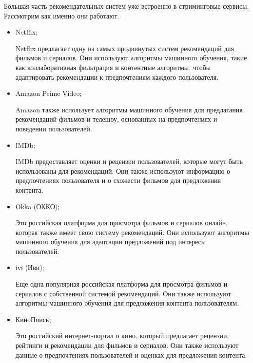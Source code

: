 Большая часть рекомендательных систем уже встроенно в стриминговые сервисы.
Рассмотрим как именно они работают.
\begin{itemize}
	\item Netflix; \par
	Netflix предлагает одну из самых продвинутых систем рекомендаций для фильмов и сериалов.
	Они используют алгоритмы машинного обучения, такие как коллаборативная фильтрация и контентные алгоритмы, чтобы
	адаптировать рекомендации к предпочтениям каждого пользователя.

	\item Amazon Prime Video; \par
	Amazon также использует алгоритмы машинного обучения для предлагания рекомендаций фильмов и телешоу,
	основанных на предпочтениях и поведении пользователей.

	\item IMDb; \par
	IMDb предоставляет оценки и рецензии пользователей, которые могут быть использованы для рекомендаций.
	Они также используют информацию о предпочтениях пользователя и о схожести фильмов для предложения контента.

	\item Okko (ОККО); \par
	Это российская платформа для просмотра фильмов и сериалов онлайн, которая также имеет свою систему рекомендаций.
	Они используют алгоритмы машинного обучения для адаптации предложений под интересы пользователей.

	\item ivi (Иви);\par
	Еще одна популярная российская платформа для просмотра фильмов и сериалов с собственной системой рекомендаций.
	Они также используют алгоритмы машинного обучения для предложения контента пользователям.

	\item КиноПоиск;\par
	Это российский интернет-портал о кино, который предлагает рецензии, рейтинги и рекомендации для фильмов и сериалов.
	Они также используют данные о предпочтениях пользователей и оценках для предложения контента.

\end{itemize}


